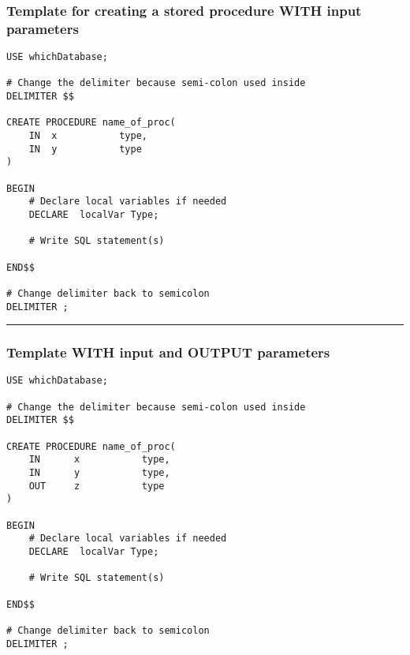 \documentclass{article}
\begin{document}
  
\subsubsection*{ \textbf{Template} for creating a stored procedure WITH input parameters}

 

\begin{lstlisting}[frame=single]  
USE whichDatabase;

# Change the delimiter because semi-colon used inside
DELIMITER $$

CREATE PROCEDURE name_of_proc(
	IN 	x 			type,
	IN 	y			type
)

BEGIN
	# Declare local variables if needed
	DECLARE  localVar Type;
	
	# Write SQL statement(s)
	
END$$

# Change delimiter back to semicolon
DELIMITER ;
\end{lstlisting} 





   
  
  
  
  
  
  
  
  
  
  
  
  
  
  
  
  
  
  
  
  
\hspace{-0.5cm}\rule[-0.101in]{\textwidth}{0.0025in}
  
  
\subsubsection*{ \textbf{Template} WITH input and OUTPUT parameters}

 

\begin{lstlisting}[frame=single]  
USE whichDatabase;

# Change the delimiter because semi-colon used inside
DELIMITER $$

CREATE PROCEDURE name_of_proc(
	IN 		x 			type,
	IN 		y			type, 
	OUT 	z			type
)

BEGIN
	# Declare local variables if needed
	DECLARE  localVar Type;
	
	# Write SQL statement(s)
	
END$$

# Change delimiter back to semicolon
DELIMITER ;
\end{lstlisting} 
\end{document}
